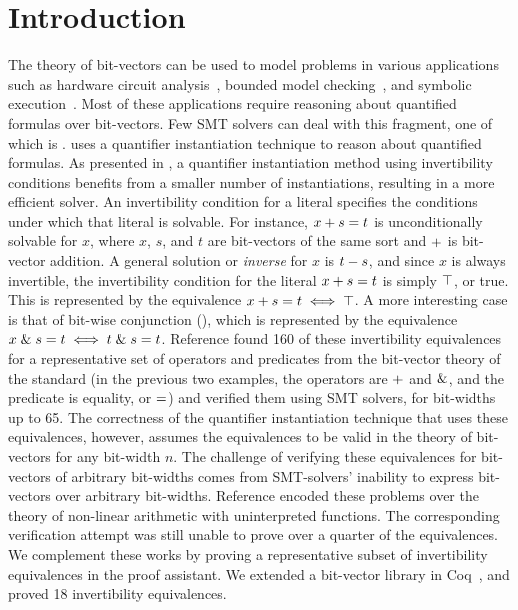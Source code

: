 \documentclass[10pt,conference]{IEEEtran}
\begin{document}
\section{Introduction}
\label{sec:intro}
The theory of bit-vectors can be used to model problems 
in various applications such as hardware 
circuit analysis~\cite{Gupta:1993:RSM:259794.259827}, 
bounded model checking~\cite{Armando2008BoundedMC}, and symbolic execution~\cite{Cadar:2006:EAG:1180405.1180445}. Most of 
these applications require reasoning about quantified 
formulas over bit-vectors. Few SMT solvers can deal 
with this fragment, one of which is \cvcfour. \cvcfour 
uses a quantifier 
instantiation technique to reason about quantified formulas. 
As presented in \cite{b1}, a quantifier instantiation 
method using invertibility conditions benefits from a smaller 
number of instantiations, resulting in a more efficient 
solver. An invertibility condition for a literal specifies 
the conditions under which that literal is solvable. For 
instance, $x + s = t$ is unconditionally solvable 
for $x$, where $x$, $s$, and $t$ are bit-vectors of the 
same sort and $+$ is bit-vector addition. 
A general solution or \emph{inverse} for $x$ is $t - s$, and 
since $x$ is always invertible, the invertibility condition 
for the literal $x + s = t$ is 
simply $\top$, or true. This is represented by the equivalence 
$x + s = t \iff \top$. 
A more interesting case is that 
of bit-wise conjunction (\bvand{}{}), which is represented by the 
equivalence 
$x \mathrel{\&} s = t \iff t \mathrel{\&} s = t$.
Reference \cite{b1} found 
160 of these invertibility equivalences for a 
representative set of operators and predicates from the 
bit-vector theory of the \smtlib standard 
(in the previous two examples, the operators are 
$+$ and $\mathrel{\&}$, 
and the predicate is equality, or $=$) and verified them 
using SMT solvers, for bit-widths up to 65. The correctness of the quantifier 
instantiation technique that uses these equivalences,
however, assumes the equivalences to be valid in the 
theory of bit-vectors for any bit-width $n$.
The challenge of verifying these equivalences for 
bit-vectors of arbitrary bit-widths comes from 
SMT-solvers' inability to express bit-vectors over
arbitrary bit-widths. Reference \cite{b2} encoded 
these problems over the theory of non-linear arithmetic 
with uninterpreted functions. The corresponding verification 
attempt was still unable to prove over a quarter of the 
equivalences. We complement these works by proving a 
representative subset of invertibility equivalences in 
the \coq proof assistant. We extended a bit-vector 
library in Coq~\cite{DBLP:conf/cav/EkiciMTKKRB17}, and proved 18 invertibility equivalences.
\end{document}
